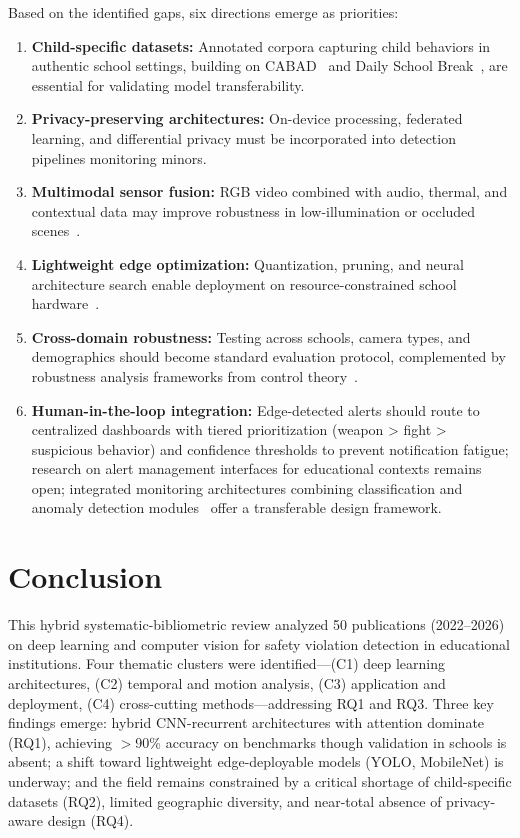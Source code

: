 \documentclass[conference]{IEEEtran}
\begin{document}
Based on the identified gaps, six directions emerge as priorities:
\begin{enumerate}
\item \textbf{Child-specific datasets:} Annotated corpora capturing child behaviors in authentic school settings, building on CABAD~\cite{b15} and Daily School Break~\cite{b11}, are essential for validating model transferability.
\item \textbf{Privacy-preserving architectures:} On-device processing, federated learning, and differential privacy must be incorporated into detection pipelines monitoring minors.
\item \textbf{Multimodal sensor fusion:} RGB video combined with audio, thermal, and contextual data may improve robustness in low-illumination or occluded scenes~\cite{b21,b22}.
\item \textbf{Lightweight edge optimization:} Quantization, pruning, and neural architecture search enable deployment on resource-constrained school hardware~\cite{b7,b23}.
\item \textbf{Cross-domain robustness:} Testing across schools, camera types, and demographics should become standard evaluation protocol, complemented by robustness analysis frameworks from control theory~\cite{b25}.
\item \textbf{Human-in-the-loop integration:} Edge-detected alerts should route to centralized dashboards with tiered prioritization (weapon > fight > suspicious behavior) and confidence thresholds to prevent notification fatigue; research on alert management interfaces for educational contexts remains open; integrated monitoring architectures combining classification and anomaly detection modules~\cite{b24} offer a transferable design framework.
\end{enumerate}

\section{Conclusion}

This hybrid systematic-bibliometric review analyzed 50 publications (2022--2026) on deep learning and computer vision for safety violation detection in educational institutions. Four thematic clusters were identified---(C1) deep learning architectures, (C2) temporal and motion analysis, (C3) application and deployment, (C4) cross-cutting methods---addressing RQ1 and RQ3. Three key findings emerge: hybrid CNN-recurrent architectures with attention dominate (RQ1), achieving $>$90\% accuracy on benchmarks though validation in schools is absent; a shift toward lightweight edge-deployable models (YOLO, MobileNet) is underway; and the field remains constrained by a critical shortage of child-specific datasets (RQ2), limited geographic diversity, and near-total absence of privacy-aware design (RQ4).
\end{document}
